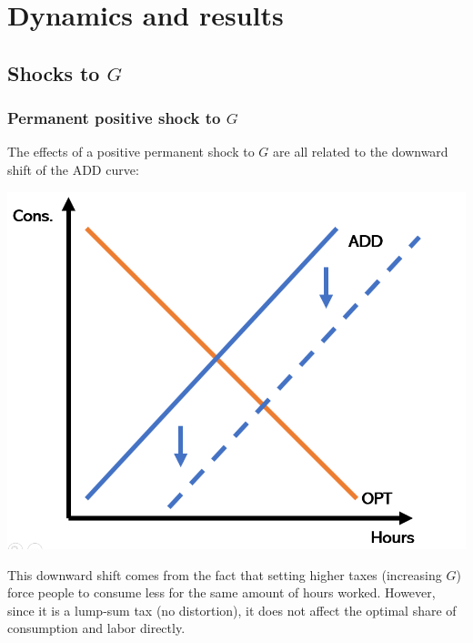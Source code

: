 \documentclass[12pt]{report}
\begin{document}
\section{Dynamics and results}

\subsection{Shocks to $G$}

\subsubsection{Permanent positive shock to $G$}

The effects of a positive permanent shock to $G$ are all related to the downward shift of the ADD curve:
\begin{center}
 \includegraphics[scale=0.40]{images/RBC1-gshock.PNG}
\end{center}

This downward shift comes from the fact that setting higher taxes (increasing $G$) force people to consume less for the same amount of hours worked. However, since it is a lump-sum tax (no distortion), it does not affect the optimal share of consumption and labor directly.
\end{document}
